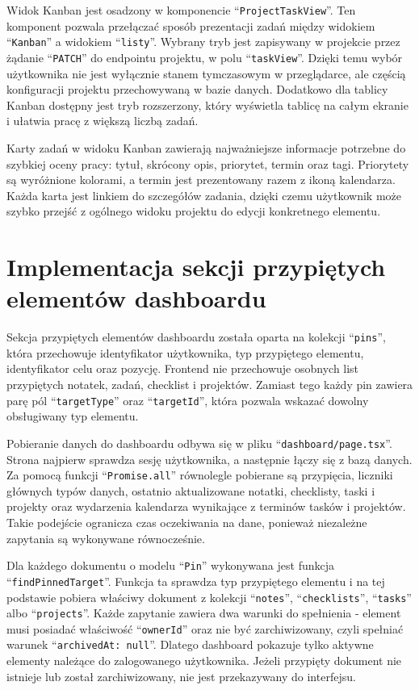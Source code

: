 \documentclass[12pt,a4paper,twoside]{report}
\newcommand{\FirstParagraph}{\noindent\ignorespaces}
\begin{document}
Widok Kanban jest osadzony w komponencie ``\texttt{ProjectTaskView}''. Ten komponent pozwala przełączać sposób prezentacji zadań między widokiem ``\texttt{Kanban}'' a widokiem ``\texttt{listy}''. Wybrany tryb jest zapisywany w projekcie przez żądanie ``\texttt{PATCH}'' do endpointu projektu, w polu ``\texttt{taskView}''. Dzięki temu wybór użytkownika nie jest wyłącznie stanem tymczasowym w przeglądarce, ale częścią konfiguracji projektu przechowywaną w bazie danych. Dodatkowo dla tablicy Kanban dostępny jest tryb rozszerzony, który wyświetla tablicę na całym ekranie i ułatwia pracę z większą liczbą zadań.

Karty zadań w widoku Kanban zawierają najważniejsze informacje potrzebne do szybkiej oceny pracy: tytuł, skrócony opis, priorytet, termin oraz tagi. Priorytety są wyróżnione kolorami, a termin jest prezentowany razem z ikoną kalendarza. Każda karta jest linkiem do szczegółów zadania, dzięki czemu użytkownik może szybko przejść z ogólnego widoku projektu do edycji konkretnego elementu.

\section{Implementacja sekcji przypiętych elementów dashboardu}

\FirstParagraph Sekcja przypiętych elementów dashboardu została oparta na kolekcji ``\texttt{pins}'', która przechowuje identyfikator użytkownika, typ przypiętego elementu, identyfikator celu oraz pozycję. Frontend nie przechowuje osobnych list przypiętych notatek, zadań, checklist i projektów. Zamiast tego każdy pin zawiera parę pól ``\texttt{targetType}'' oraz ``\texttt{targetId}'', która pozwala wskazać dowolny obsługiwany typ elementu.

Pobieranie danych do dashboardu odbywa się w pliku ``\texttt{dashboard/page.tsx}''. Strona najpierw sprawdza sesję użytkownika, a następnie łączy się z bazą danych. Za pomocą funkcji ``\texttt{Promise.all}'' równolegle pobierane są przypięcia, liczniki głównych typów danych, ostatnio aktualizowane notatki, checklisty, taski i projekty oraz wydarzenia kalendarza wynikające z terminów tasków i projektów. Takie podejście ogranicza czas oczekiwania na dane, ponieważ niezależne zapytania są wykonywane równocześnie.

Dla każdego dokumentu o modelu ``\texttt{Pin}'' wykonywana jest funkcja ``\texttt{findPinned\allowbreak Target}''. Funkcja ta sprawdza typ przypiętego elementu i na tej podstawie pobiera właściwy dokument z kolekcji ``\texttt{notes}'', ``\texttt{checklists}'', ``\texttt{tasks}'' albo ``\texttt{projects}''. Każde zapytanie zawiera dwa warunki do spełnienia - element musi posiadać właściwość ``\texttt{ownerId}'' oraz nie być zarchiwizowany, czyli spełniać warunek ``\texttt{archivedAt: null}''. Dlatego dashboard pokazuje tylko aktywne elementy należące do zalogowanego użytkownika. Jeżeli przypięty dokument nie istnieje lub został zarchiwizowany, nie jest przekazywany do interfejsu.
\end{document}
